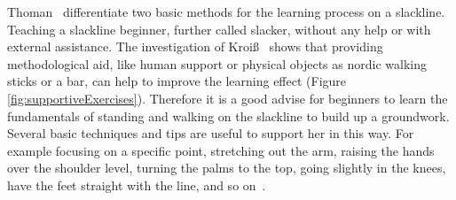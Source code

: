 Thoman~\cite{Thomann2013-aa} differentiate two basic methods for the learning process on a slackline. Teaching a slackline beginner, further called slacker, without any help or with external assistance. The investigation of Kroiß~\cite{Kroiss2007-ab} shows that providing methodological aid, like human support or physical objects as nordic walking sticks or a bar, can help to improve the learning effect (Figure \ref{fig:supportiveExercises}). Therefore it is a good advise for beginners to learn the fundamentals of standing and walking on the slackline to build up a groundwork. Several basic techniques and tips are useful to support her in this way. For example focusing on a specific point, stretching out the arm, raising the hands over the shoulder level, turning the palms to the top, going slightly in the knees, have the feet straight with the line, and so on~\cite{Kleindl2011-bl, Kroiss2007-ab}.

